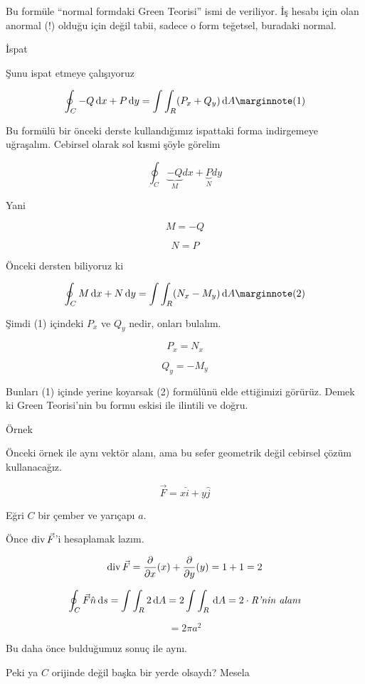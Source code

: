 \documentclass[12pt,fleqn]{article}\usepackage{../../common}
\begin{document}
Bu formüle ``normal formdaki Green Teorisi'' ismi de veriliyor. İş hesabı
için olan anormal (!) olduğu için değil tabii, sadece o form teğetsel,
buradaki normal. 

İspat

Şunu ispat etmeye çalışıyoruz

$$
\oint_C -Q \ud x + P \ud y = \int \int_R (P_x + Q_y) \ud A 
\mlabel{1}
$$

Bu formülü bir önceki derste kullandığımız ispattaki forma indirgemeye
uğraşalım. Cebirsel olarak sol kısmi şöyle görelim

$$ \oint_C 
\underbrace{-Q}_{M}dx + 
\underbrace{P}_{N}dy 
$$

Yani 

$$ M = -Q $$

$$ N = P $$

Önceki dersten biliyoruz ki 

$$
\oint_C M \ud x + N \ud y = \int \int_R (N_x - M_y) \ud A 
\mlabel{2}
$$

Şimdi (1) içindeki $P_x$ ve $Q_y$ nedir, onları bulalım. 

$$ P_x = N_x $$

$$ Q_y = -M_y $$

Bunları (1) içinde yerine koyarsak (2) formülünü elde ettiğimizi görürüz. Demek
ki Green Teorisi'nin bu formu eskisi ile ilintili ve doğru.

Örnek

Önceki örnek ile aynı vektör alanı, ama bu sefer geometrik değil cebirsel
çözüm kullanacağız. 

$$ \vec{F} = x\hat{i} + y\hat{j} $$

Eğri $C$ bir çember ve yarıçapı $a$. 

Önce $\operatorname{div} \vec{F}$'i hesaplamak lazım. 

$$ \operatorname{div} \vec{F}  = 
\frac{\partial }{\partial x}(x) + 
\frac{\partial }{\partial y}(y) = 
1 + 1 = 2 
 $$

$$
\oint_C \vec{F} \hat{n} \,\mathrm{d} s = 
\int \int_R 2 \,\mathrm{d} A = 2 \int \int_R \,\mathrm{d} A = 
2 \cdot \textit{R'nin alanı}
$$

$$ = 2\pi a^2 $$

Bu daha önce bulduğumuz sonuç ile aynı.

Peki ya $C$ orijinde değil başka bir yerde olsaydı? Mesela 
\end{document}
